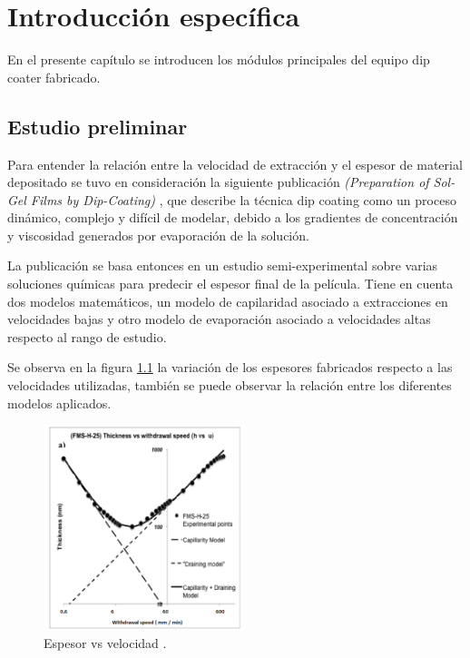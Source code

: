 
\chapter{Introducción específica} %

\label{Chapter2} %

En el presente capítulo se introducen los módulos principales del equipo dip coater fabricado.   

\section{Estudio preliminar}

Para entender la relación entre la velocidad de extracción y el espesor de material depositado se tuvo en consideración la siguiente publicación \textit{(Preparation of Sol-Gel Films by Dip-Coating)} \cite{paper_galo}, que describe la técnica dip coating como un proceso dinámico, complejo y difícil de modelar, debido a los gradientes de concentración y viscosidad generados por evaporación de la solución. 


La publicación se basa entonces en un estudio semi-experimental sobre varias soluciones químicas para predecir el espesor final de la película. Tiene en cuenta dos modelos matemáticos, un modelo de capilaridad asociado a extracciones en velocidades bajas y otro modelo de evaporación asociado a velocidades altas respecto al rango de estudio. 

Se observa en la figura \ref{fig:paper_galo} la variación de los espesores fabricados respecto a las velocidades utilizadas, también se puede observar la relación entre los diferentes modelos aplicados. 

\begin{figure}[!h]
\centering 
\includegraphics[width=0.52\textwidth]{./Figures/paper_galo.png}
\caption{Espesor vs velocidad \protect\footnotemark.}
\label{fig:paper_galo}
\end{figure}

